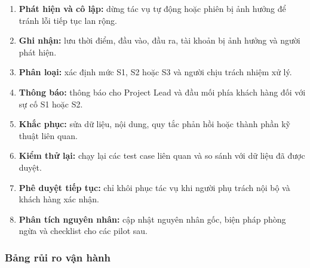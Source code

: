 \begin{enumerate}
    \item \textbf{Phát hiện và cô lập:} dừng tác vụ tự động hoặc phiên bị ảnh hưởng để tránh lỗi tiếp tục lan rộng.
    \item \textbf{Ghi nhận:} lưu thời điểm, đầu vào, đầu ra, tài khoản bị ảnh hưởng và người phát hiện.
    \item \textbf{Phân loại:} xác định mức S1, S2 hoặc S3 và người chịu trách nhiệm xử lý.
    \item \textbf{Thông báo:} thông báo cho Project Lead và đầu mối phía khách hàng đối với sự cố S1 hoặc S2.
    \item \textbf{Khắc phục:} sửa dữ liệu, nội dung, quy tắc phản hồi hoặc thành phần kỹ thuật liên quan.
    \item \textbf{Kiểm thử lại:} chạy lại các test case liên quan và so sánh với dữ liệu đã được duyệt.
    \item \textbf{Phê duyệt tiếp tục:} chỉ khôi phục tác vụ khi người phụ trách nội bộ và khách hàng xác nhận.
    \item \textbf{Phân tích nguyên nhân:} cập nhật nguyên nhân gốc, biện pháp phòng ngừa và checklist cho các pilot sau.
\end{enumerate}

\subsubsection{Bảng rủi ro vận hành}

